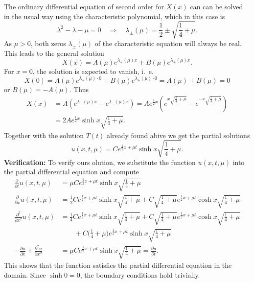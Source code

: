 \begin{loesung}
\begin{teilaufgaben}
The ordinary differential equation of second order for $X(x)$ can
can be solved in the usual way using the characteristic polynomial,
which in this case is
\[
\lambda^2-\lambda-\mu=0
\quad
\Rightarrow
\quad
\lambda_{\pm}(\mu)=\frac12\pm\sqrt{\frac14+\mu}.
\]
As $\mu>0$, both zeros $\lambda_{\pm}(\mu)$ of the characteristic
equation will always be real.
This leads to the general solution
\[
X(x)=
A(\mu)e^{\lambda_+(\mu)x}
+
B(\mu)e^{\lambda_+(\mu)x}.
\]
For $x=0$, the solution is expected to vanish, i.~e.
\[
X(0)=
A(\mu)e^{\lambda_+(\mu)\cdot 0}
+
B(\mu)e^{\lambda_+(\mu)\cdot 0}
=A(\mu)+B(\mu)=0
\]
or $B(\mu)=-A(\mu)$.
Thus
\begin{align*}
X(x)&=A(e^{\lambda_+(\mu)x}-e^{\lambda_-(\mu)x})
=Ae^{\frac12x}\left(
e^{x\sqrt{\frac14+\mu}}
-
e^{-x\sqrt{\frac14+\mu}}
\right)
\\
&=2Ae^{\frac12x}\sinh x\sqrt{\frac14+\mu}.
\end{align*}
Together with the solution $T(t)$ already found abive we get the
partial solutions
\[
u(x,t,\mu)=
Ce^{\frac12x+\mu t}\sinh x\sqrt{\frac14+\mu}.
\]
{\bf Verification:}
To verify ours olution, we substitute the function $u(x,t,\mu)$
into the partial differential equation and compute
\begin{align*}
\frac{\partial}{\partial t}u(x,t,\mu)&=
\mu Ce^{\frac12x+\mu t}\sinh x\sqrt{\frac14+\mu}
\\
\frac{\partial}{\partial x}u(x,t,\mu)&=
\frac12
Ce^{\frac12x+\mu t}\sinh x\sqrt{\frac14+\mu}
+
C\sqrt{\frac14+\mu}e^{\frac12x+\mu t}\cosh x\sqrt{\frac14+\mu}
\\
\frac{\partial^2}{\partial x^2}u(x,t,\mu)&=
\frac14
Ce^{\frac12x+\mu t}\sinh x\sqrt{\frac14+\mu}
+
C\sqrt{\frac14+\mu}e^{\frac12x+\mu t}\cosh x\sqrt{\frac14+\mu}
\\
&\qquad +
C\biggl(\frac14+\mu\biggr)e^{\frac12x+\mu t}\sinh x\sqrt{\frac14+\mu}
\\
-\frac{\partial u}{\partial x}
+
\frac{\partial^2 u}{\partial x^2}
&=
\mu Ce^{\frac12x+\mu t}\sinh x\sqrt{\frac14+\mu}
=
\frac{\partial u}{\partial t}.
\end{align*}
This shows that the function satisfies the partial differential
equation in the domain.
Since $\sinh 0=0$, the boundary conditions hold trivially.
\qedhere
\end{teilaufgaben}
\end{loesung}
